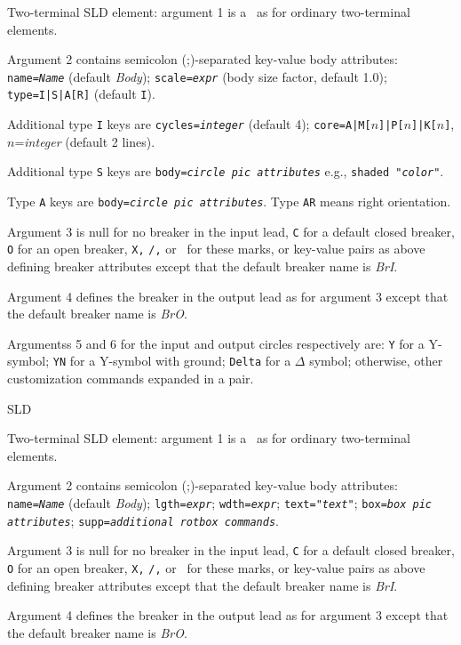  {Two-terminal SLD element: argument 1 is a \linespec\ as for ordinary
   two-terminal elements.

   Argument 2 contains semicolon (;)-separated key-value body attributes:
   {\tt name={\sl{}Name}} (default {\sl Body});
   {\tt scale={\sl expr}} (body size factor, default 1.0);
   {\tt type=I|S|A[R]} (default {\tt I}).

   Additional type {\tt I} keys are
   {\tt cycles={\sl{}integer}} (default 4);
   {\tt core=A|M[$n$]|P[$n$]|K[$n$]}, $n$={\sl integer} (default 2 lines).

   Additional type {\tt S} keys are
   {\tt body={\sl circle pic attributes}} e.g., {\tt shaded "{\sl color}"}.

   Type {\tt A} keys are
   {\tt body={\sl circle pic attributes}}.  Type {\tt AR} means right
   orientation.

   Argument 3 is null for no breaker in the input lead, {\tt C} for a default
   closed breaker, {\tt O} for an open breaker, {\tt X,} {\tt /,} or \bsl\ for
   these marks, or
   key-value pairs as above defining breaker attributes
   except that the default breaker name is {\sl BrI}.

   Argument 4 defines the breaker in the output lead as for argument 3
   except that the default breaker name is {\sl BrO}.

   Argumentss 5 and 6 for the input and output circles respectively are:
   {\tt Y} for a Y-symbol;
   {\tt YN} for a Y-symbol with ground;
   {\tt Delta} for a $\Delta$ symbol;
   otherwise, other customization commands expanded in a {\tt \lbr\rbr} pair.
   }%
%
%
  {SLD}%
  {Two-terminal SLD element: argument 1 is a \linespec\ as for ordinary
   two-terminal elements.

   Argument 2 contains semicolon (;)-separated key-value body attributes:
   {\tt name={\sl{}Name}} (default {\sl Body});
   {\tt lgth={\sl{}expr}};
   {\tt wdth={\sl{}expr}};
   {\tt text="{\sl{}text}"};
   {\tt box={\sl{}box pic attributes}};
   {\tt supp={\sl{}additional {\tt rotbox} commands}}.

   Argument 3 is null for no breaker in the input lead, {\tt C} for a default
   closed breaker, {\tt O} for an open breaker, {\tt X,} {\tt /,} or \bsl\ for
   these marks, or
   key-value pairs as above defining breaker attributes
   except that the default breaker name is {\sl BrI}.

   Argument 4 defines the breaker in the output lead as for argument 3
   except that the default breaker name is {\sl BrO}.
   \label{sl_ttbox}
   }%
